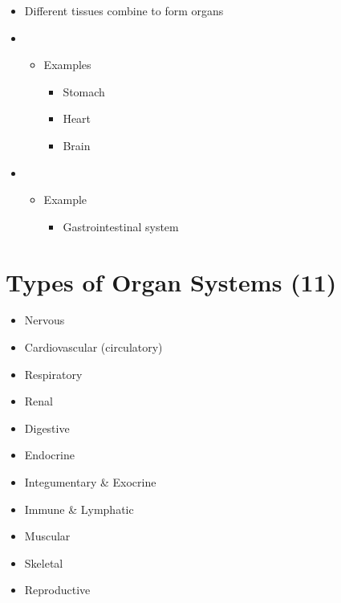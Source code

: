 \documentclass[title={Chapter 3}]{fdsn201notes}
\begin{document}
\begin{itemize}
	\item Different tissues combine to form organs
	\item {}
	\begin{itemize}
		\item Examples
		\begin{itemize}
			\item Stomach
			\item Heart
			\item Brain
		\end{itemize}
	\end{itemize}
	\item {}
	\begin{itemize}
		\item Example
		\begin{itemize}
			\item Gastrointestinal system
		\end{itemize}
	\end{itemize}
\end{itemize}

\section{Types of Organ Systems (11)}\label{sec:types-of-organ-systems-(11)}
\begin{itemize}
	\item Nervous
	\item Cardiovascular (circulatory)
	\item Respiratory
	\item Renal
	\item Digestive
	\item Endocrine
	\item Integumentary \& Exocrine
	\item Immune \& Lymphatic
	\item Muscular
	\item Skeletal
	\item Reproductive
\end{itemize}
\end{document}
